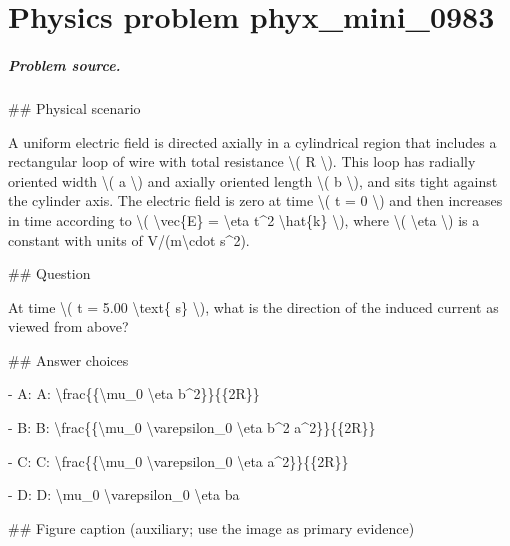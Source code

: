
\chapter{Physics problem phyx\_mini\_0983}
\label{ch:PhyXMiniProblems_problem_phyx_mini_0983}

\paragraph{Problem source.}
\#\# Physical scenario

A uniform electric field is directed axially in a cylindrical region that includes a rectangular loop of wire with total resistance \textbackslash{}( R \textbackslash{}). This loop has radially oriented width \textbackslash{}( a \textbackslash{}) and axially oriented length \textbackslash{}( b \textbackslash{}), and sits tight against the cylinder axis. The electric field is zero at time \textbackslash{}( t = 0 \textbackslash{}) and then increases in time according to \textbackslash{}( \textbackslash{}vec\{E\} = \textbackslash{}eta t\textasciicircum{}2 \textbackslash{}hat\{k\} \textbackslash{}), where \textbackslash{}( \textbackslash{}eta \textbackslash{}) is a constant with units of V/(m\textbackslash{}cdot s\textasciicircum{}2).

\#\# Question

At time \textbackslash{}( t = 5.00 \textbackslash{}text\{ s\} \textbackslash{}), what is the direction of the induced current as viewed from above?

\#\# Answer choices

- A: A: \textbackslash{}frac\{\{\textbackslash{}mu\_0 \textbackslash{}eta b\textasciicircum{}2\}\}\{\{2R\}\}

- B: B: \textbackslash{}frac\{\{\textbackslash{}mu\_0 \textbackslash{}varepsilon\_0 \textbackslash{}eta b\textasciicircum{}2 a\textasciicircum{}2\}\}\{\{2R\}\}

- C: C: \textbackslash{}frac\{\{\textbackslash{}mu\_0 \textbackslash{}varepsilon\_0 \textbackslash{}eta a\textasciicircum{}2\}\}\{\{2R\}\}

- D: D: \textbackslash{}mu\_0 \textbackslash{}varepsilon\_0 \textbackslash{}eta ba

\#\# Figure caption (auxiliary; use the image as primary evidence)

